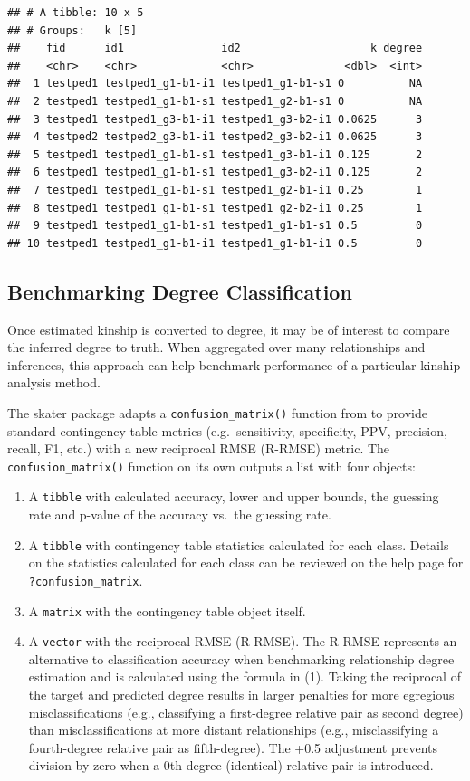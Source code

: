 \documentclass[9pt,a4paper,]{extarticle}
\begin{document}
\begin{verbatim}
## # A tibble: 10 x 5
## # Groups:   k [5]
##    fid      id1               id2                    k degree
##    <chr>    <chr>             <chr>              <dbl>  <int>
##  1 testped1 testped1_g1-b1-i1 testped1_g1-b1-s1 0          NA
##  2 testped1 testped1_g1-b1-s1 testped1_g2-b1-s1 0          NA
##  3 testped1 testped1_g3-b1-i1 testped1_g3-b2-i1 0.0625      3
##  4 testped2 testped2_g3-b1-i1 testped2_g3-b2-i1 0.0625      3
##  5 testped1 testped1_g1-b1-s1 testped1_g3-b1-i1 0.125       2
##  6 testped1 testped1_g1-b1-s1 testped1_g3-b2-i1 0.125       2
##  7 testped1 testped1_g1-b1-s1 testped1_g2-b1-i1 0.25        1
##  8 testped1 testped1_g1-b1-s1 testped1_g2-b2-i1 0.25        1
##  9 testped1 testped1_g1-b1-s1 testped1_g1-b1-s1 0.5         0
## 10 testped1 testped1_g1-b1-i1 testped1_g1-b1-i1 0.5         0
\end{verbatim}

\hypertarget{benchmarking-degree-classification}{%
\subsection{Benchmarking Degree Classification}\label{benchmarking-degree-classification}}

Once estimated kinship is converted to degree, it may be of interest to compare the inferred degree to truth. When aggregated over many relationships and inferences, this approach can help benchmark performance of a particular kinship analysis method.

The skater package adapts a \texttt{confusion\_matrix()} function from \citet{clark2021} to provide standard contingency table metrics (e.g.~sensitivity, specificity, PPV, precision, recall, F1, etc.) with a new reciprocal RMSE (R-RMSE) metric. The \texttt{confusion\_matrix()} function on its own outputs a list with four objects:

\begin{enumerate}
\def\labelenumi{\arabic{enumi}.}
\item
  A \texttt{tibble} with calculated accuracy, lower and upper bounds, the guessing rate and p-value of the accuracy vs.~the guessing rate.
\item
  A \texttt{tibble} with contingency table statistics calculated for each class. Details on the statistics calculated for each class can be reviewed on the help page for \texttt{?confusion\_matrix}.
\item
  A \texttt{matrix} with the contingency table object itself.
\item
  A \texttt{vector} with the reciprocal RMSE (R-RMSE). The R-RMSE represents an alternative to classification accuracy when benchmarking relationship degree estimation and is calculated using the formula in (1). Taking the reciprocal of the target and predicted degree results in larger penalties for more egregious misclassifications (e.g., classifying a first-degree relative pair as second degree) than misclassifications at more distant relationships (e.g., misclassifying a fourth-degree relative pair as fifth-degree). The +0.5 adjustment prevents division-by-zero when a 0th-degree (identical) relative pair is introduced.
\end{enumerate}
\end{document}

